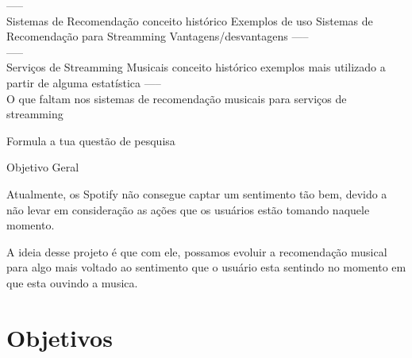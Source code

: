 \documentclass{article}
\begin{document}
----- \\

Sistemas de Recomendação
   conceito
   histórico
   Exemplos de uso
   Sistemas de Recomendação para Streamming
   Vantagens/desvantagens
----- \\






----- \\

Serviços de Streamming Musicais
  conceito
  histórico
  exemplos
  mais utilizado a partir de alguma estatística
----- \\







O que faltam nos sistemas de recomendação musicais para serviços de streamming


Formula a tua questão de pesquisa


Objetivo Geral


Atualmente, os Spotify não consegue captar um sentimento tão bem, devido a não levar em consideração as ações que os usuários estão tomando naquele momento. 

A ideia desse projeto é que com ele, possamos evoluir a recomendação musical para algo mais voltado ao sentimento que o usuário esta sentindo no momento em que esta ouvindo a musica.

\newpage

\section{Objetivos}
\end{document}
